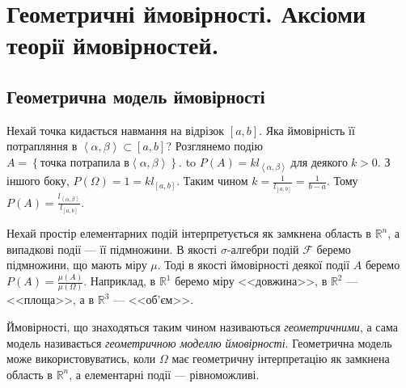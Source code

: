 
\newlength\Radius
\setlength\Radius{2cm}

\section{Геометричні ймовірності. Аксіоми теорії ймовірностей.}
\subsection{Геометрична модель ймовірності}
\begin{example}
    Нехай точка кидається навмання на відрізок $\left[a, b\right]$. 
    Яка ймовірність її 
    потрапляння в $\left<\alpha, \beta\right> \subset  \left[a, b\right]$?
    \newline
    Розглянемо подію $A = \left\{ 
        \text{точка потрапила в} \left<\alpha, \beta\right>
    \right\}$.
    \newline
    \hbox to 
    $P(A) = kl_{\left<\alpha, \beta\right>}\; \text{для деякого}\; k > 0$.
    З іншого боку, $P(\Omega) = 1 = kl_{\left[a, b\right]}$. Таким чином 
    $k = \frac{1}{l_{\left[a, b\right]}} = \frac{1}{b-a}$.
    Тому $P(A) = \frac{l_{\left<\alpha, \beta\right>}}{l_{\left[a, b\right]}}$.
\end{example}
Нехай простір елементарних подій інтерпретується як замкнена область в 
$ \mathbb{R} ^n$, а випадкові події --- її підмножини. В якості $\sigma$-алгебри 
подій $\mathcal{F}$ беремо підмножини, що мають міру $\mu$. Тоді в якості ймовірності 
деякої події $A$ беремо $P(A) = \frac{\mu(A)}{\mu(\Omega)}$. 
Наприклад, в $\mathbb{R}^1$ беремо міру <<довжина>>, в $\mathbb{R}^2$ --- <<площа>>, а в $\mathbb{R}^3$ --- <<об'єм>>.

Ймовірності, що знаходяться таким чином називаються \emph{геометричними}, а сама модель 
називається \emph{геометричною моделлю ймовірності}.
Геометрична модель може використовуватись, 
коли $\Omega$ має геометричну інтерпретацію як замкнена область в $\mathbb{R}^n$,
а елементарні події --- рівноможливі.

